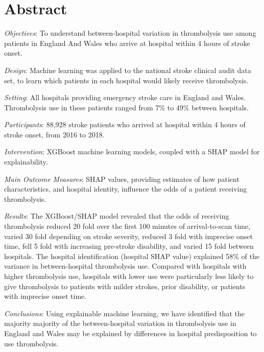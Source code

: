 \section*{Abstract}

\emph{Objectives}: To understand between-hospital variation in thrombolysis use among patients in England And Wales who arrive at hospital within 4 hours of stroke onset.

\emph{Design}: Machine learning was applied to the national stroke clinical audit data set, to learn which patients in each hospital would likely receive thrombolysis.

\emph{Setting}: All hospitals providing emergency stroke care in England and Wales. Thrombolysis use in these patients ranged from 7\% to 49\% between hospitals.

\emph{Participants}: 88,928 stroke patients who arrived at hospital within 4 hours of stroke onset, from 2016 to 2018.

\emph{Intervention}: XGBoost machine learning models, coupled with a SHAP model for explainability.

\emph{Main Outcome Measures}: SHAP values, providing estimates of how patient characteristics, and hospital identity, influence the odds of a patient receiving thrombolysis.

\emph{Results}: The XGBoost/SHAP model revealed that the odds of receiving thrombolysis reduced 20 fold over the first 100 minutes of arrival-to-scan time, varied 30 fold depending on stroke severity, reduced 3 fold with imprecise onset time, fell 5 fold with increasing pre-stroke disability, and varied 15 fold between hospitals. The hospital identification (hospital SHAP value) explained 58\% of the variance in between-hospital thrombolysis use. Compared with hospitals with higher thrombolysis use, hospitals with lower use were particularly less likely to give thrombolysis to patients with milder strokes, prior disability, or patients with imprecise onset time.

\emph{Conclusions}: Using explainable machine learning, we have identified that the majority majority of the between-hospital variation in thrombolysis use in England and Wales may be explained by differences in hospital predisposition to use thrombolysis.